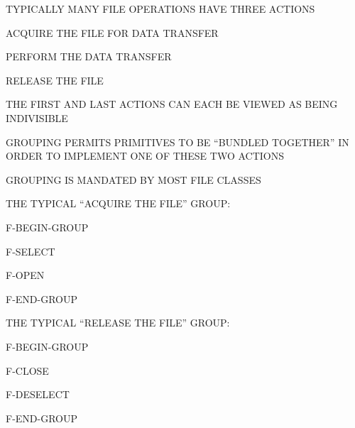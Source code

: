 \begin{bwslide}

\begin{nrtc}
\item	TYPICALLY MANY FILE OPERATIONS HAVE THREE ACTIONS
    \begin{nrtc}
    \item	ACQUIRE THE FILE FOR DATA TRANSFER

    \item	PERFORM THE DATA TRANSFER

    \item	RELEASE THE FILE
    \end{nrtc}

\item	THE FIRST AND LAST ACTIONS CAN EACH BE VIEWED AS BEING INDIVISIBLE

\item	GROUPING PERMITS PRIMITIVES TO BE ``BUNDLED TOGETHER''
	IN ORDER TO IMPLEMENT ONE OF THESE TWO ACTIONS

\item	GROUPING IS MANDATED BY MOST FILE CLASSES
\end{nrtc}
\end{bwslide}


\begin{bwslide}

\begin{nrtc}
\item	THE TYPICAL ``ACQUIRE THE FILE'' GROUP:
    \begin{nrtc}
    \item	F-BEGIN-GROUP

    \item	F-SELECT

    \item	F-OPEN

    \item	F-END-GROUP
    \end{nrtc}

\item	THE TYPICAL ``RELEASE THE FILE'' GROUP:
    \begin{nrtc}
    \item	F-BEGIN-GROUP

    \item	F-CLOSE

    \item	F-DESELECT

    \item	F-END-GROUP
    \end{nrtc}
\end{nrtc}
\end{bwslide}


